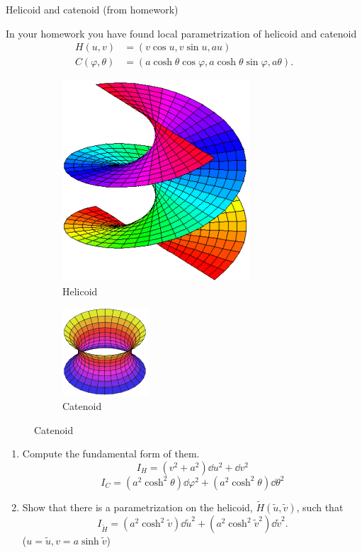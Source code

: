 \begin{example}Helicoid and catenoid (from homework)

In your homework you have found local parametrization of helicoid and 
catenoid 
\begin{align*}
    H(u,v)&=\left(v\cos u, v\sin u, a u\right)\\
    C(\varphi,\theta)&=\left(a \cosh \theta \cos \varphi,
    a\cosh \theta \sin \varphi ,a \theta \right) .       
\end{align*}
\begin{figure}[h]
    \centering
    \begin{subfigure}{0.3\textwidth}
        \centering
        \includegraphics[scale=0.65]{picture/week7/helicoid.png}
        \caption{Helicoid}
    \end{subfigure}
    \begin{subfigure}{0.3\textwidth}
        \centering
        \includegraphics[scale=1.5]{picture/week7/catenoid.png}
        \caption{Catenoid}    
    \end{subfigure}
\end{figure}
\begin{enumerate}[(1)]
    \item Compute the  fundamental form of them.
    \[ I_H=\left(v^2+a^2\right)\dd u^2+\dd v^2\]
    \[I_C=\left(a^2\cosh^2\theta\right)\dd\varphi^2+
    \left(a^2\cosh^2\theta\right)\dd \theta^2\]
    \item Show that there is a parametrization on the helicoid, 
    \(\tilde{H}\left(\tilde{u},\tilde{v}\right)\), such that
    \[
        I_{\tilde{H}}=\left(a^2\cosh^2\tilde{v}\right)\dd \tilde{u}^2
        +\left(a^2\cosh^2\tilde{v}^2\right)\dd \tilde{v}^2    
    .\]
    (\(u=\tilde{u},v=a\sinh\tilde{v}\))
\end{enumerate}
\end{example}
